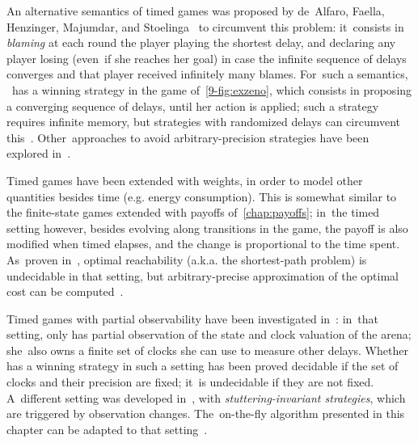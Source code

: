 An alternative semantics of timed games was proposed by de~Alfaro,
Faella, Henzinger, Majumdar, and Stoelinga~\cite{AFHMS03} to
circumvent this problem: it~consists in \emph{blaming} at each round
the player playing the shortest delay, and declaring any player losing
(even~if she reaches her goal) in case the infinite sequence of delays
converges and that player received infinitely many blames.  For~such a
semantics, \Eve~has a winning strategy in the game
of~\cref{9-fig:exzeno}, which consists in proposing a converging
sequence of delays, until her action is applied; such a strategy
requires infinite memory, but strategies with randomized delays can
circumvent this~\cite{CHP08}. Other~approaches to avoid
arbitrary-precision strategies have been explored
in~\cite{BMS15,BFM15,LLTW14,ORS14}.

Timed games have been extended with weights, in order to model other
quantities besides time (e.g. energy consumption). This is somewhat
similar to the finite-state games extended with payoffs
of~\cref{chap:payoffs}; in~the timed setting however, besides evolving
along transitions in the game, the payoff is also modified when timed
elapses, and the change is proportional to the time spent. As~proven
in~\cite{BBR05,BBM06}, optimal reachability (a.k.a. the shortest-path
problem) is undecidable in that setting, but arbitrary-precise
approximation of the optimal cost can be computed~\cite{BJM15}.


Timed games with partial observability have been investigated
in~\cite{BDMP03}: in~that setting, \Eve only has partial observation
of the state and clock valuation of the arena; she~also owns a finite
set of clocks she can use to measure other delays. Whether \Eve has a
winning strategy in such a setting has been proved decidable if the
set of clocks and their precision are fixed; it~is undecidable if they
are not fixed.
%
A~different setting was developed in~\cite{CDLLR07}, with
\emph{stuttering-invariant strategies}, which are triggered by
observation changes. The~on-the-fly algorithm presented in this
chapter can be adapted to that setting~\cite{CDLLR07}. 

